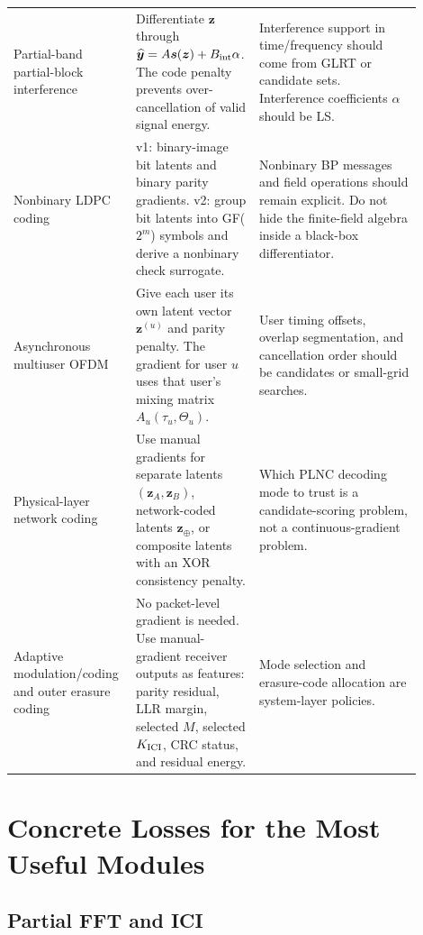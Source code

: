 \documentclass[11pt]{article}
\begin{document}
\begin{longtable}{@{}>{\raggedright\arraybackslash}p{0.24\linewidth}>{\raggedright\arraybackslash}p{0.28\linewidth}>{\raggedright\arraybackslash}p{0.38\linewidth}@{}}
Partial-band partial-block interference
& Differentiate $\bm z$ through
$\widehat{\bm y}=A\bm s(\bm z)+B_{\rm int}\alpha$.  The code penalty prevents
over-cancellation of valid signal energy.
& Interference support in time/frequency should come from GLRT or candidate
sets.  Interference coefficients $\alpha$ should be LS. \\

Nonbinary LDPC coding
& v1: binary-image bit latents and binary parity gradients.  v2: group bit
latents into GF($2^m$) symbols and derive a nonbinary check surrogate.
& Nonbinary BP messages and field operations should remain explicit.  Do not
hide the finite-field algebra inside a black-box differentiator. \\

Asynchronous multiuser OFDM
& Give each user its own latent vector $\bm z^{(u)}$ and parity penalty.  The
gradient for user $u$ uses that user's mixing matrix
$A_u(\tau_u,\Theta_u)$.
& User timing offsets, overlap segmentation, and cancellation order should be
candidates or small-grid searches. \\

Physical-layer network coding
& Use manual gradients for separate latents $(\bm z_A,\bm z_B)$, network-coded
latents $\bm z_\oplus$, or composite latents with an XOR consistency penalty.
& Which PLNC decoding mode to trust is a candidate-scoring problem, not a
continuous-gradient problem. \\

Adaptive modulation/coding and outer erasure coding
& No packet-level gradient is needed.  Use manual-gradient receiver outputs as
features: parity residual, LLR margin, selected $M$, selected $K_{\rm ICI}$,
CRC status, and residual energy.
& Mode selection and erasure-code allocation are system-layer policies. \\
\bottomrule
\end{longtable}

\section{Concrete Losses for the Most Useful Modules}

\subsection{Partial FFT and ICI}
\end{document}
